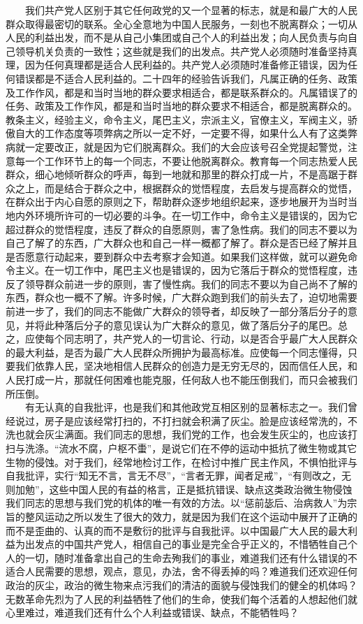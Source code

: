 \documentclass[cn,11pt,chinese]{elegantbook}
\begin{document}
　　我们共产党人区别于其它任何政党的又一个显著的标志，就是和最广大的人民群众取得最密切的联系。全心全意地为中国人民服务，一刻也不脱离群众；一切从人民的利益出发，而不是从自己小集团或自己个人的利益出发；向人民负责与向自己领导机关负责的一致性；这些就是我们的出发点。共产党人必须随时准备坚持真理，因为任何真理都是适合人民利益的。共产党人必须随时准备修正错误，因为任何错误都是不适合人民利益的。二十四年的经验告诉我们，凡属正确的任务、政策及工作作风，都是和当时当地的群众要求相适合，都是联系群众的。凡属错误了的任务、政策及工作作风，都是和当时当地的群众要求不相适合，都是脱离群众的。教条主义，经验主义，命令主义，尾巴主义，宗派主义，官僚主义，军阀主义，骄傲自大的工作态度等项弊病之所以一定不好，一定要不得，如果什么人有了这类弊病就一定要改正，就是因为它们脱离群众。我们的大会应该号召全党提起警觉，注意每一个工作环节上的每一个同志，不要让他脱离群众。教育每一个同志热爱人民群众，细心地倾听群众的呼声，每到一地就和那里的群众打成一片，不是高踞于群众之上，而是结合于群众之中，根据群众的觉悟程度，去启发与提高群众的觉悟，在群众出于内心自愿的原则之下，帮助群众逐步地组织起来，逐步地展开为当时当地内外环境所许可的一切必要的斗争。在一切工作中，命令主义是错误的，因为它超过群众的觉悟程度，违反了群众的自愿原则，害了急性病。我们的同志不要以为自己了解了的东西，广大群众也和自己一样一概都了解了。群众是否已经了解并且是否愿意行动起来，要到群众中去考察才会知道。如果我们这样做，就可以避免命令主义。在一切工作中，尾巴主义也是错误的，因为它落后于群众的觉悟程度，违反了领导群众前进一步的原则，害了慢性病。我们的同志不要以为自己尚不了解的东西，群众也一概不了解。许多时候，广大群众跑到我们的前头去了，迫切地需要前进一步了，我们的同志不能做广大群众的领导者，却反映了一部分落后分子的意见，并将此种落后分子的意见误认为广大群众的意见，做了落后分子的尾巴。总之，应使每个同志明了，共产党人的一切言论、行动，以是否合乎最广大人民群众的最大利益，是否为最广大人民群众所拥护为最高标准。应使每一个同志懂得，只要我们依靠人民，坚决地相信人民群众的创造力是无穷无尽的，因而信任人民，和人民打成一片，那就任何困难也能克服，任何敌人也不能压倒我们，而只会被我们所压倒。\\
　　有无认真的自我批评，也是我们和其他政党互相区别的显著标志之一。我们曾经说过，房子是应该经常打扫的，不打扫就会积满了灰尘。脸是应该经常洗的，不洗也就会灰尘满面。我们同志的思想，我们党的工作，也会发生灰尘的，也应该打扫与洗涤。“流水不腐，户枢不蟗”，是说它们在不停的运动中抵抗了微生物或其它生物的侵蚀。对于我们，经常地检讨工作，在检讨中推广民主作风，不惧怕批评与自我批评，实行“知无不言，言无不尽”，“言者无罪，闻者足戒”，“有则改之，无则加勉”，这些中国人民的有益的格言，正是抵抗错误、缺点这类政治微生物侵蚀我们同志的思想与我们党的机体的唯一有效的方法。以“惩前毖后、治病救人”为宗旨的整风运动之所以发生了很大的效力，就是因为我们在这个运动中展开了正确的而不是歪曲的、认真的而不是敷衍的批评与自我批评。以中国最广大人民的最大利益为出发点的中国共产党人，相信自己的事业是完全合乎正义的，不惜牺牲自己个人的一切，随时准备拿出自己的生命去殉我们的事业，难道我们还有什么错误的不适合人民需要的思想，观点，意见，办法，舍不得丢掉的吗？难道我们还欢迎任何政治的灰尘，政治的微生物来点污我们的清洁的面貌与侵蚀我们的健全的机体吗？无数革命先烈为了人民的利益牺牲了他们的生命，使我们每个活着的人想起他们就心里难过，难道我们还有什么个人利益或错误、缺点，不能牺牲吗？\\
\end{document}
